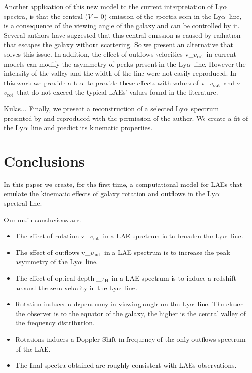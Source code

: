 \documentclass[a4paper,fleqn,usenatbib]{mnras}
\newcommand{\lya}{\ifmmode{{\rm Ly}\alpha}\else Ly$\alpha$\ \fi}
\newcommand{\vrot}{\ifmmode\mathrm v_{\mathrm{rot}}\else $v_{\mathrm{rot}}$~\fi}
\newcommand{\vout}{\ifmmode\mathrm v_{\mathrm{out}}\else $v_{\mathrm{out}}$~\fi}
\newcommand{\tauh}{\ifmmode\mathrm \tau_{\mathrm{H}}\else $\tau_{\mathrm{H}}$~\fi}
\begin{document}
Another application of this new model to the current interpretation of \lya
spectra, is that the central ($V=0$) emission of the spectra seen in the 
\lya line, is a consequence of the viewing angle of the galaxy and can be 
controlled by it. Several authors have suggested that this central emission 
is caused by radiation that escapes the galaxy without scattering. So we 
present an alternative that solves this issue. In addition, the effect of
outflows velocities \vrot in current models can modify the asymmetry of peaks
present in the \lya line. However the intensity of the valley and the width 
of the line were not easily reproduced. In this work we provide a tool to
provide these effects with values of \vout and \vrot that do not exceed the
typical LAEs' values found in the literature. 

\color{red}
Kulas...
\color{black}
Finally, we present a reconstruction of a selected \lya spectrum presented
by \cite{Kulas12} and reproduced with the permission of the author. We create
a fit of the \lya line and predict its kinematic properties. 

\section{Conclusions}
\label{sec:conclusions}

In this paper we create, for the first time, a computational model for LAEs 
that emulate the kinematic effects of galaxy rotation and outflows in the \lya
spectral line. 

Our main conclusions are:

\begin{itemize}
	\item The effect of rotation \vrot in a LAE spectrum is to broaden the 
	\lya line.
	
	\item The effect of outflows \vout in a LAE spectrum is to increase the peak 
	asymmetry of the \lya line.
	
	\item The effect of optical depth \tauh in a LAE spectrum is to induce a 
	redshift around the zero velocity in the \lya line.
	
	\item Rotation induces a dependency in viewing angle on the \lya line. The 
	closer the observer is to the equator of the galaxy, the higher is the central 
	valley of the frequency distribution. 
	
	\item Rotations induces a Doppler Shift in frequency of the only-outflows 
	spectrum of the LAE.
	
	\item The final spectra obtained are roughly consistent with LAEs 
	observations. 
\end{itemize}
\end{document}
